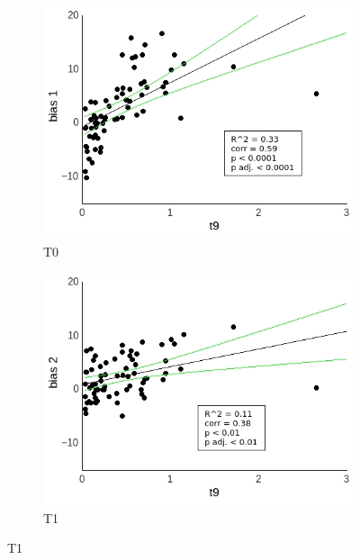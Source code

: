 \documentclass[a4paper]{scrreprt}
\begin{document}
\begin{figure}
\centering
\begin{subfigure}[b]{0.49\textwidth}
        \includegraphics[width=\textwidth]{figs/sec3/t9/t9_diff_1_mod1mod1.jpeg}
        \caption{T0}
    \end{subfigure}
    \begin{subfigure}[b]{0.49\textwidth}
        \includegraphics[width=\textwidth]{figs/sec3/t9/t9_diff_2_mod1mod1.jpeg}
        \caption{T1}
    \end{subfigure}


\end{figure}
\end{document}

